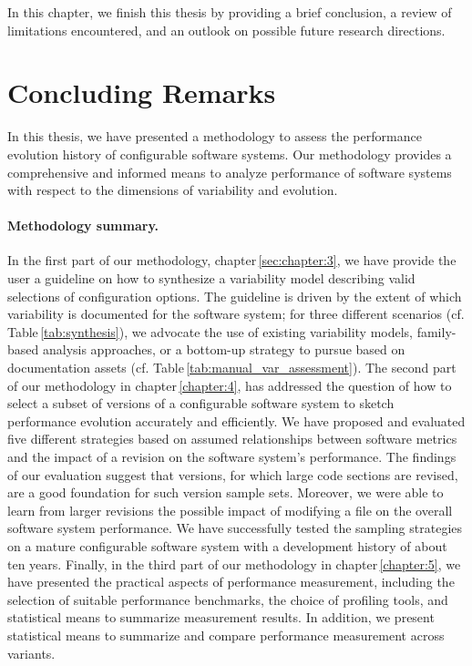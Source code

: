 In this chapter, we finish this thesis by providing a brief conclusion, a review
of limitations encountered, and an outlook on possible future research directions.

\section{Concluding Remarks}
In this thesis, we have presented a methodology to assess the performance
evolution history of configurable software systems. Our methodology provides a
comprehensive and informed means to analyze performance of software systems
with respect to the dimensions of variability and evolution.

\paragraph{Methodology summary.} In the first part of our methodology,
chapter\,\ref{sec:chapter:3}, we have provide the user a guideline on how to synthesize a
variability model describing valid selections of configuration options. The guideline is driven by the extent of which variability is documented for the software system; for three different
scenarios (cf. Table\,\ref{tab:synthesis}), we advocate the use of existing
variability models, family-based analysis approaches, or a bottom-up strategy to pursue based on
documentation assets (cf. Table\,\ref{tab:manual_var_assessment}). 
The second part of our methodology in chapter\,\ref{chapter:4}, has
addressed the question of how to select a subset of versions of a configurable
software system to sketch performance evolution accurately and efficiently. We
have proposed and evaluated five different strategies based on assumed
relationships between software metrics and the impact of a revision on the
software system’s performance. The findings of our evaluation suggest that
versions, for which large code sections are revised, are a good foundation for
such version sample sets. Moreover, we were able to learn from larger revisions
the possible impact of modifying a file on the overall software system
performance. We have successfully tested the sampling strategies on a mature
configurable software system with a development history of about ten years.
Finally, in the third part of our methodology in chapter\,\ref{chapter:5}, we
have presented the practical aspects of performance measurement, including the selection of
suitable performance benchmarks, the choice of profiling tools, and statistical
means to summarize measurement results. In addition, we present  statistical
means to summarize and compare performance measurement across variants.

